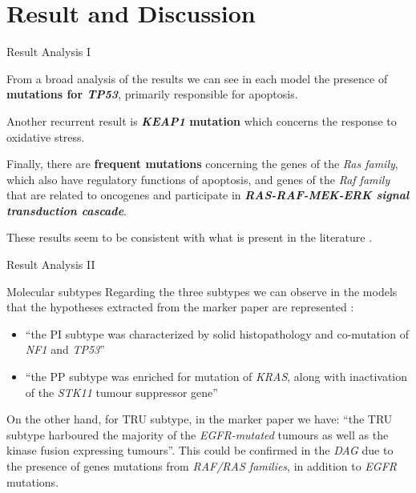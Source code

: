 \documentclass{beamer}
\begin{document}
\section{Result and Discussion}
\begin{frame}{Result Analysis I}
  \begin{block}{}
    From a broad analysis of the results we can see in each model the presence
    of \textbf{mutations for \textit{TP53}}, primarily responsible for
    apoptosis. 
  \end{block}
  \pause
  \begin{block}{}
    Another recurrent result is \textbf{\textit{KEAP1} mutation} which concerns
    the response to oxidative stress. 
  \end{block}
  \pause
  \begin{block}{}
    Finally, there are \textbf{frequent mutations} concerning the genes of the
    \textit{Ras family}, which also have regulatory functions of apoptosis, and
    genes of the \textit{Raf family} that are related to oncogenes and
    participate in \textbf{\textit{RAS-RAF-MEK-ERK signal transduction
        cascade}}.  
  \end{block}
  \pause
  \begin{alertblock}{}
    These results seem to be consistent with what is present in the literature
    \cite{rasl}. 
  \end{alertblock}
\end{frame}
\begin{frame}{Result Analysis II}
  \begin{block}{Molecular subtypes}
    Regarding the three subtypes we can observe in the models that the
    hypotheses extracted from the marker paper are represented
    \cite{luadmarker}: 
    \begin{itemize}
      \item ``the PI subtype was characterized by solid histopathology and
      co-mutation of \textit{NF1} and \textit{TP53}''
      \item ``the PP subtype was enriched for mutation of \textit{KRAS}, along
      with inactivation of the \textit{STK11} tumour suppressor gene'' 
    \end{itemize}
    On the other hand, for TRU subtype, in the marker paper we have: ``the TRU
    subtype harboured the majority of the \textit{EGFR-mutated} tumours as well
    as the kinase fusion expressing tumours''. This could be confirmed in the
    \textit{DAG} due to the presence of genes mutations from \textit{RAF/RAS
      families}, in addition to \textit{EGFR} mutations. 
  \end{block}
\end{frame}
\end{document}
